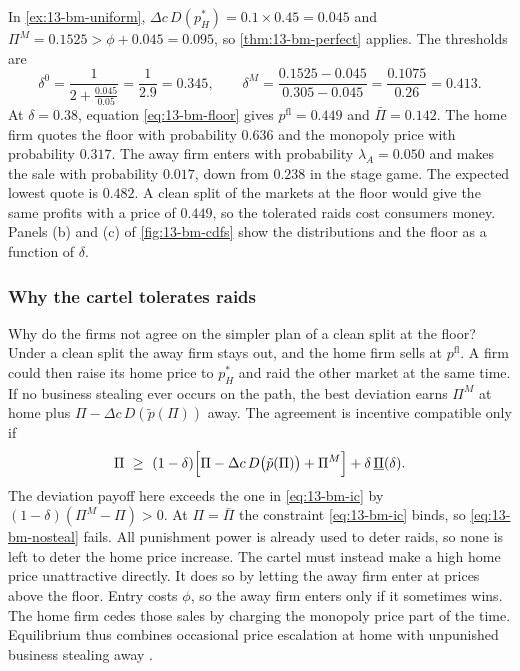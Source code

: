 \begin{example}\label{ex:13-bm-uniform-coll}
In \cref{ex:13-bm-uniform}, $\Delta c\,D(p_H^*)=0.1\times0.45=0.045$ and $\Pi^M=0.1525>\phi+0.045=0.095$, so
\cref{thm:13-bm-perfect} applies. The thresholds are
\[
\delta^0=\frac{1}{2+\frac{0.045}{0.05}}=\frac{1}{2.9}=0.345,\qquad
\delta^M=\frac{0.1525-0.045}{0.305-0.045}=\frac{0.1075}{0.26}=0.413 .
\]
At $\delta=0.38$, equation \eqref{eq:13-bm-floor} gives $p^{\mathrm{fl}}=0.449$ and $\bar\Pi=0.142$. The home
firm quotes the floor with probability $0.636$ and the monopoly price with probability $0.317$. The away firm
enters with probability $\lambda_A=0.050$ and makes the sale with probability $0.017$, down from $0.238$ in the
stage game. The expected lowest quote is $0.482$. A clean split of the markets at the floor would give the
same profits with a price of $0.449$, so the tolerated raids cost consumers money. Panels (b) and (c) of
\cref{fig:13-bm-cdfs} show the distributions and the floor as a function of $\delta$.
\end{example}

\subsubsection{Why the cartel tolerates raids}

Why do the firms not agree on the simpler plan of a clean split at the floor? Under a clean split the away
firm stays out, and the home firm sells at $p^{\mathrm{fl}}$. A firm could then raise its home price to $p_H^*$
and raid the other market at the same time. If no business stealing ever occurs on the path, the best
deviation earns $\Pi^M$ at home plus $\Pi-\Delta c\,D(\tilde p(\Pi))$ away. The agreement is incentive
compatible only if
\begin{equation}\label{eq:13-bm-nosteal}
\Pi\ \ge\ (1-\delta)\Bigl[\Pi-\Delta c\,D\bigl(\tilde p(\Pi)\bigr)+\Pi^M\Bigr]+\delta\,\underline\Pi(\delta).
\end{equation}
The deviation payoff here exceeds the one in \eqref{eq:13-bm-ic} by $(1-\delta)(\Pi^M-\Pi)>0$. At
$\Pi=\bar\Pi$ the constraint \eqref{eq:13-bm-ic} binds, so \eqref{eq:13-bm-nosteal} fails. All punishment
power is already used to deter raids, so none is left to deter the home price increase. The cartel must
instead make a high home price unattractive directly. It does so by letting the away firm enter at prices
above the floor. Entry costs $\phi$, so the away firm enters only if it sometimes wins. The home firm cedes
those sales by charging the monopoly price part of the time. Equilibrium thus combines occasional price
escalation at home with unpunished business stealing away \citep[pp.~15--17]{BernheimMadsen2017}.

